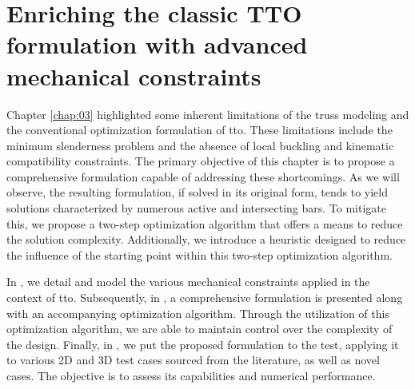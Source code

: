 \setchapterpreamble[u]{\margintoc}
\glsresetall %
\chapter{Enriching the classic TTO formulation with advanced mechanical constraints}
\label{chap:04}
Chapter \ref{chap:03} highlighted some inherent limitations of the truss modeling and the conventional optimization formulation of \gls{tto}. These limitations include the minimum slenderness problem and the absence of local buckling and kinematic compatibility constraints. The primary objective of this chapter is to propose a comprehensive formulation capable of addressing these shortcomings. As we will observe, the resulting formulation, if solved in its original form, tends to yield solutions characterized by numerous active and intersecting bars. To mitigate this, we propose a two-step optimization algorithm that offers a means to reduce the solution complexity. Additionally, we introduce a heuristic designed to reduce the influence of the starting point within this two-step optimization algorithm.

In , we detail and model the various mechanical constraints applied in the context of \gls{tto}. Subsequently, in , a comprehensive formulation is presented along with an accompanying optimization algorithm. Through the utilization of this optimization algorithm, we are able to maintain control over the complexity of the design. Finally, in , we put the proposed formulation to the test, applying it to various 2D and 3D test cases sourced from the literature, as well as novel cases. The objective is to assess its capabilities and numerical performance.

